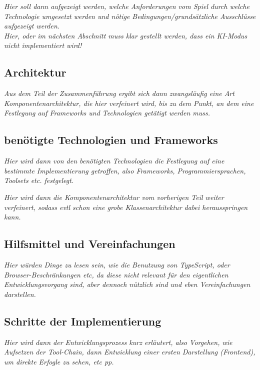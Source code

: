 \emph{Hier soll dann aufgezeigt werden, welche Anforderungen vom Spiel durch welche Technologie umgesetzt werden und nötige Bedingungen/grundsätzliche Ausschlüsse aufgezeigt werden.\\Hier, oder im nächsten Abschnitt muss klar gestellt werden, dass ein KI-Modus nicht implementiert wird!}

\subsection{Architektur}
\label{subsec:Architektur}

\emph{Aus dem Teil der Zusammenführung ergibt sich dann zwangsläufig eine Art Komponentenarchitektur, die hier verfeinert wird, bis zu dem Punkt, an dem eine Festlegung auf Frameworks und Technologien getätigt werden muss.}

\subsection{benötigte Technologien und Frameworks}
\label{subsec:Technologien}

\emph{Hier wird dann von den benötigten Technologien die Festlegung auf eine bestimmte Implementierung getroffen, also Frameworks, Programmiersprachen, Toolsets etc. festgelegt.}


\emph{Hier wird dann die Komponentenarchitektur vom vorherigen Teil weiter verfeinert, sodass evtl schon eine grobe Klassenarchitektur dabei herausspringen kann.}

\subsection{Hilfsmittel und Vereinfachungen}
\label{subsec:Hilfsmittel}

\emph{Hier würden Dinge zu lesen sein, wie die Benutzung von TypeScript, oder Browser-Beschränkungen etc, da diese nicht relevant für den eigentlichen Entwicklungsvorgang sind, aber dennoch nützlich sind und eben Vereinfachungen darstellen.}

\subsection{Schritte der Implementierung}
\label{subsec:Implementierung}

\emph{Hier wird dann der Entwicklungsprozess kurz erläutert, also Vorgehen, wie Aufsetzen der Tool-Chain, dann Entwicklung einer ersten Darstellung (Frontend), um direkte Erfogle zu sehen, etc pp.}

